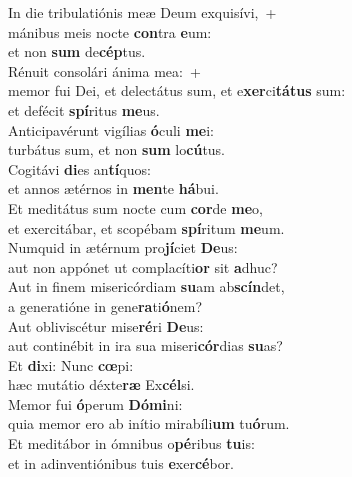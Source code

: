 \evenverse In die tribulatiónis meæ Deum exquisívi,~+\\\evenverse  mánibus meis nocte \textbf{con}tra \textbf{e}um:~\*\\
\evenverse et non \textbf{sum} de\textbf{cép}tus.\\
\oddverse Rénuit consolári ánima mea:~+\\
\oddverse  memor fui Dei, et delectátus sum, et e\textbf{xer}ci\textbf{tá}\textbf{tus} sum:~\*\\
\oddverse et defécit \textbf{spí}ritus \textbf{me}us.\\
\evenverse Anticipavérunt vigílias \textbf{ó}culi \textbf{me}i:~\*\\
\evenverse turbátus sum, et non \textbf{sum} lo\textbf{cú}tus.\\
\oddverse Cogitávi \textbf{di}es an\textbf{tí}quos:~\*\\
\oddverse et annos ætérnos in \textbf{men}te \textbf{há}bui.\\
\evenverse Et meditátus sum nocte cum \textbf{cor}de \textbf{me}o,~\*\\
\evenverse et exercitábar, et scopébam \textbf{spí}ritum \textbf{me}um.\\
\oddverse Numquid in ætérnum pro\textbf{jí}ciet \textbf{De}us:~\*\\
\oddverse aut non appónet ut complacíti\textbf{or} sit \textbf{a}dhuc?\\
\evenverse Aut in finem misericórdiam \textbf{su}am ab\textbf{scín}det,~\*\\
\evenverse a generatióne in gene\textbf{ra}ti\textbf{ó}nem?\\
\oddverse Aut obliviscétur mise\textbf{ré}ri \textbf{De}us:~\*\\
\oddverse aut continébit in ira sua miseri\textbf{cór}dias \textbf{su}as?\\
\evenverse Et \textbf{di}xi: Nunc \textbf{cœ}pi:~\*\\
\evenverse hæc mutátio déxte\textbf{ræ} Ex\textbf{cél}si.\\
\oddverse Memor fui \textbf{ó}perum \textbf{Dó}\textbf{mi}ni:~\*\\
\oddverse quia memor ero ab inítio mirabíli\textbf{um} tu\textbf{ó}rum.\\
\evenverse Et meditábor in ómnibus o\textbf{pé}ribus \textbf{tu}is:~\*\\
\evenverse et in adinventiónibus tuis \textbf{e}xer\textbf{cé}bor.\\
